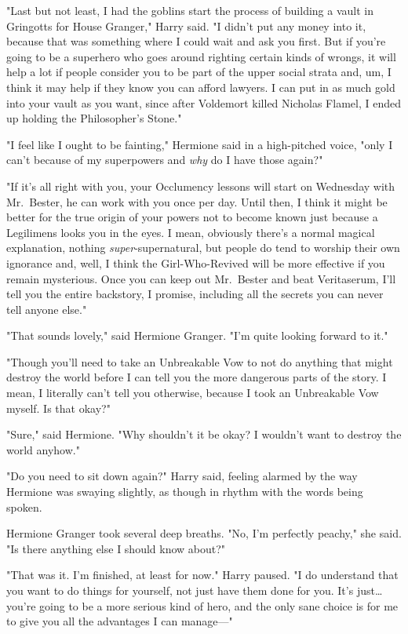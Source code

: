 "Last but not least, I had the goblins start the process of building a vault in
Gringotts for House Granger," Harry said. "I didn't put any money into it,
because that was something where I could wait and ask you first. But if you're
going to be a superhero who goes around righting certain kinds of wrongs, it
will help a lot if people consider you to be part of the upper social strata
and, um, I think it may help if they know you can afford lawyers. I can put in
as much gold into your vault as you want, since after Voldemort killed Nicholas
Flamel, I ended up holding the Philosopher's Stone."

"I feel like I ought to be fainting," Hermione said in a high-pitched voice,
"only I can't because of my superpowers and \emph{why} do I have those again?"

"If it's all right with you, your Occlumency lessons will start on Wednesday
with Mr.~Bester, he can work with you once per day. Until then, I think it
might be better for the true origin of your powers not to become known just
because a Legilimens looks you in the eyes. I mean, obviously there's a normal
magical explanation, nothing \emph{super}-supernatural, but people do tend to
worship their own ignorance and, well, I think the Girl-Who-Revived will be
more effective if you remain mysterious. Once you can keep out Mr.~Bester and
beat Veritaserum, I'll tell you the entire backstory, I promise, including all
the secrets you can never tell anyone else."

"That sounds lovely," said Hermione Granger. "I'm quite looking forward to it."

"Though you'll need to take an Unbreakable Vow to not do anything that might
destroy the world before I can tell you the more dangerous parts of the story.
I mean, I literally can't tell you otherwise, because I took an Unbreakable Vow
myself. Is that okay?"

"Sure," said Hermione. "Why shouldn't it be okay? I wouldn't want to destroy
the world anyhow."

"Do you need to sit down again?" Harry said, feeling alarmed by the way
Hermione was swaying slightly, as though in rhythm with the words being spoken.

Hermione Granger took several deep breaths. "No, I'm perfectly peachy," she
said. "Is there anything else I should know about?"

"That was it. I'm finished, at least for now." Harry paused. "I do understand
that you want to do things for yourself, not just have them done for you. It's
just{\ldots} you're going to be a more serious kind of hero, and the only sane
choice is for me to give you all the advantages I can manage---"

